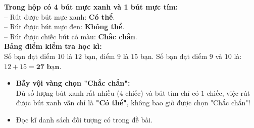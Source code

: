 \documentclass[11pt,a4paper]{article}
\begin{document}
\vspace{-2.5mm}
\noindent
\begin{minipage}[t]{0.49\textwidth}\vspace{0pt}
\begin{tcolorbox}[
  enhanced,
  colback=green!4!white,
  colframe=green!60!black,
  arc=2mm, boxrule=0.8pt,
  left=2mm, right=2mm, top=1.8mm, bottom=1.8mm,
  title={\footnotesize\bfseries\color{white}\faCheckCircle\ Ví dụ thực hành chuẩn mực}
]
{\footnotesize
\textbf{Trong hộp có 4 bút mực xanh và 1 bút mực tím:}\\
-- Rút được bút mực xanh: \textbf{Có thể}.\\
-- Rút được bút mực đen: \textbf{Không thể}.\\
-- Rút được chiếc bút có màu: \textbf{Chắc chắn}.\\
\textbf{Bảng điểm kiểm tra học kì:}\\
Số bạn đạt điểm $10$ là $12$ bạn, điểm $9$ là $15$ bạn. Số bạn đạt điểm $9$ và $10$ là: $12 + 15 = \mathbf{27\text{ bạn}}$.
}
\end{tcolorbox}
\end{minipage}
\hfill
\begin{minipage}[t]{0.49\textwidth}\vspace{0pt}
\begin{tcolorbox}[
  enhanced,
  colback=red!4!white,
  colframe=red!70!black,
  arc=2mm, boxrule=0.8pt,
  left=2mm, right=2mm, top=1.8mm, bottom=1.8mm,
  title={\footnotesize\bfseries\color{white}\faExclamationTriangle\ Mẹo tránh bẫy trắc nghiệm}
]
{\footnotesize
\begin{itemize}\setlength{\itemsep}{1.5pt}\setlength{\leftskip}{-2.5mm}
  \item \textbf{Bẫy vội vàng chọn "Chắc chắn":}\\
  Dù số lượng bút xanh rất nhiều ($4$ chiếc) và bút tím chỉ có $1$ chiếc, việc rút được bút xanh vẫn chỉ là \textbf{"Có thể"}, không bao giờ được chọn "Chắc chắn"!
  \item Đọc kĩ danh sách đối tượng có trong đề bài.
\end{itemize}
}
\end{tcolorbox}
\end{minipage}
\end{document}

